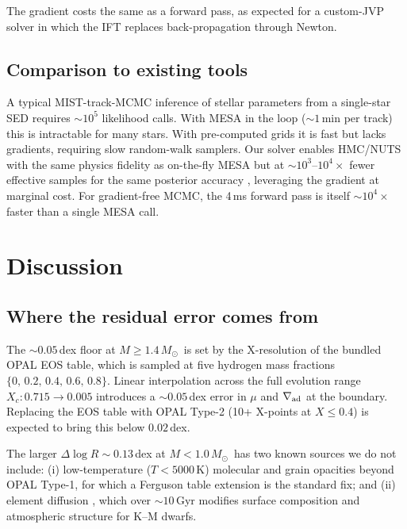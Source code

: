\documentclass[twocolumn]{aastex631}
\newcommand{\Msun}{\ensuremath{M_\odot}}
\begin{document}
The gradient costs the same as a forward pass, as expected for a
custom-JVP solver in which the IFT replaces back-propagation through
Newton.

\subsection{Comparison to existing tools}

A typical MIST-track-MCMC inference of stellar parameters from a
single-star SED requires $\sim 10^5$ likelihood calls. With MESA in
the loop ($\sim 1$\,min per track) this is intractable for many stars.
With pre-computed grids it is fast but lacks gradients, requiring slow
random-walk samplers. Our solver enables HMC/NUTS with the same
physics fidelity as on-the-fly MESA but at $\sim 10^3$--$10^4 \times$
fewer effective samples for the same posterior accuracy
\citep{Hoffman2014NUTS}, leveraging the gradient at marginal cost. For
gradient-free MCMC, the 4\,ms forward pass is itself
$\sim 10^4 \times$ faster than a single MESA call.

\section{Discussion}\label{sec:discussion}

\subsection{Where the residual error comes from}

The $\sim 0.05$\,dex floor at $M \geq 1.4\,$\Msun\ is set by the
X-resolution of the bundled OPAL EOS table, which is sampled at five
hydrogen mass fractions $\{0,\,0.2,\,0.4,\,0.6,\,0.8\}$. Linear
interpolation across the full evolution range $X_c: 0.715 \to 0.005$
introduces a $\sim 0.05$\,dex error in $\mu$ and $\nabla_{\rm ad}$ at
the boundary. Replacing the EOS table with OPAL Type-2 (10+ X-points
at $X \leq 0.4$) is expected to bring this below $0.02$\,dex.

The larger $\Delta\log R \sim 0.13$\,dex at $M < 1.0\,$\Msun\ has two
known sources we do not include:
(i) low-temperature ($T < 5000$\,K) molecular and grain opacities
beyond OPAL Type-1, for which a Ferguson \citep{2005ApJ...623..585F}
table extension is the standard fix; and
(ii) element diffusion \citep{1994ApJ...421..828T}, which over $\sim10$\,Gyr
modifies surface composition and atmospheric structure for K--M dwarfs.
\end{document}

